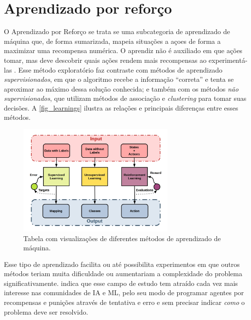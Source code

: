 \section{Aprendizado por refor{\c c}o}

O Aprendizado por Refor{\c c}o se trata se uma subcategoria de
aprendizado de m{\'a}quina que, de forma sumarizada, mapeia situa{\c
  c}{\~o}es a a{\c c}oes de forma a maximizar uma recompensa
num{\'e}rica. O aprendiz n{\~a}o {\'e} auxiliado em que a{\c c}{\~o}es
tomar, mas deve descobrir quais a{\c c}{\~o}es rendem mais recompensas
ao experiment{\'a}-las \cite{kaelbling1996}. Esse m{\'e}todo
explorat{\'o}rio faz contraste com m{\'e}todos de aprendizado
\textit{supervisionados}, em que o algoritmo recebe a informa{\c
  c}{\~a}o ``correta'' e tenta se aproximar ao m{\'a}ximo dessa
solu{\c c}{\~a}o conhecida; e tamb{\'e}m com os m{\'e}todos
\textit{n{\~a}o supervisionados}, que utilizam m{\'e}todos de
associa{\c c}{\~a}o e \textit{clustering} para tomar suas
decis{\~o}es. A \autoref{fig_learnings} ilustra as rela{\c c}{\~o}es e
principais diferen{\c c}as entre esses m{\'e}todos.

\begin{figure}[htb]
  \centering
  \caption{\label{fig_learnings}Tabela com visualiza{\c c}{\~o}es de diferentes m{\'e}todos de aprendizado de m{\'a}quina.}
  \includegraphics[width=0.7\textwidth]{images/unsupervised_supervised_reinforcement.jpeg}
\end{figure}


Esse tipo de aprendizado facilita ou at{\'e} possibilita experimentos
em que outros m{\'e}todos teriam muita dificuldade ou aumentariam a
complexidade do problema significativamente.
 indica que esse campo de estudo
tem atra{\'i}do cada vez mais interesse nas comunidades de IA e ML,
pelo seu modo de programar agentes por recompensas e puni{\c c}{\~o}es
atrav{\'e}s de tentativa e erro e sem precisar indicar \textit{como} o
problema deve ser resolvido.

